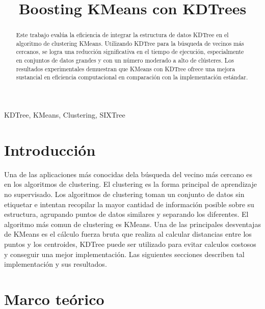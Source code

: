 \documentclass[conference]{IEEEtran}
\begin{document}
\title{Boosting KMeans con KDTrees}

\author{
}

\maketitle

\begin{abstract}
    Este trabajo evalúa la eficiencia de integrar la estructura de datos KDTree en el algoritmo de clustering KMeans. Utilizando KDTree para la búsqueda de vecinos más cercanos, se logra una reducción significativa en el tiempo de ejecución, especialmente en conjuntos de datos grandes y con un número moderado a alto de clústeres. Los resultados experimentales demuestran que KMeans con KDTree ofrece una mejora sustancial en eficiencia computacional en comparación con la implementación estándar.
\end{abstract}

\begin{IEEEkeywords}
    KDTree, KMeans, Clustering, SIXTree
\end{IEEEkeywords}

\section{Introducción}
Una de las aplicaciones más conocidas dela búsqueda del vecino más cercano es en los algoritmos de clustering. El clustering es la forma principal de aprendizaje no supervisado. Los algoritmos de clustering toman un conjunto de datos sin etiquetar e intentan recopilar la mayor cantidad de información posible sobre su estructura, agrupando puntos de datos similares y separando los diferentes. El algoritmo más comun de clustering es KMeans. Una de las principales desventajas de KMeans es el cálculo fuerza bruta que realiza al calcular distancias entre los puntos y los centroides, KDTree puede ser utilizado para evitar calculos costosos y conseguir una mejor implementación\cite{samet1988overview}\cite{bentley1975multidimensional}. Las siguientes secciones describen tal implementación y sus resultados.

\section{Marco teórico}
\end{document}
